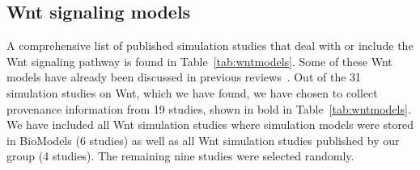 \documentclass[10pt,letterpaper]{article}
\newcommand{\wnt}{Wnt}
\begin{document}
\subsection*{\wnt{} signaling models}

A comprehensive list of published simulation studies that deal with or include the \wnt{} signaling pathway is found in Table~\ref{tab:wntmodels}.
Some of these \wnt{} models have already been discussed in previous reviews~\cite{Kofahl2010, Lloyd-Lewis2013}.
Out of the 31 simulation studies on \wnt{}, which we have found, we have chosen to collect provenance information from 19 studies, shown in bold in Table~\ref{tab:wntmodels}.
We have included all \wnt{} simulation studies where simulation models were stored in BioModels (6 studies) as well as all \wnt{} simulation studies published by our group (4 studies).
The remaining nine studies were selected randomly.
\end{document}
